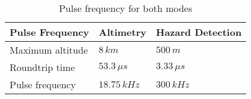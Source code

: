 \begin{table}[H]
\centering
\caption{Pulse frequency for both modes}
\label{tab:pulse_frequency}
\begin{tabular}{|l|ll|}
\hline
\textbf{Pulse Frequency}      &      Altimetry & Hazard Detection    \\ \hline
Maximum altitude  &  $8\,km$ & $500\, m$\\ 
Roundtrip time      &  $53.3\,\mu s$ & $3.33\,\mu s$ \\
Pulse frequency     & $18.75\,kHz$    & $300\,kHz$  \\ \hline
\end{tabular}
\end{table}
